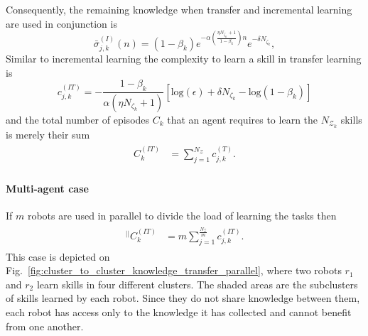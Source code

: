 Consequently, the remaining knowledge when transfer and incremental learning are used in conjunction is
\begin{equation*}\label{eq:remaining_knowledge__ITL}
	\bar{\sigma}^{(I)}_{j,k}(n) = \left(1- \beta_k\right) e^{-\alpha  \left(\frac{ \eta N_{\zeta_k}+1}{1 - \beta_k}\right) n} e^{-\delta N_{\zeta_k}},
\end{equation*}
Similar to incremental learning the complexity to learn a skill in transfer learning is
\begin{equation}\label{eq:skill_complexity_TL}
	c^{(IT)}_{j,k} = -\frac{1 - \beta_{k}}{\alpha (\eta N_{\zeta_k}+ 1)}\left[\text{log}(\epsilon) + \delta N_{\zeta_k} - \text{log}(1 - \beta_{k})\right]
\end{equation}
and the total number of episodes  $ C_k $ that an agent requires to learn the $N_{\mathcal{Z}_k}$ skills is merely their sum
\begin{align}\label{eq:total_episodes_transfer}
	\begin{split}
		C^{(IT)}_k &= \sum^{N_{\mathcal{Z}}}_{j=1} c^{(T)}_{j,k}.
	\end{split}
\end{align}

\paragraph*{Multi-agent case}
If $m$ robots are used in parallel to divide the load of learning the tasks then
\begin{align}
	\begin{split}
		{}^{\lvert \rvert}C^{(IT)}_k &= m\sum^{\frac{N_{\mathcal{Z}}}{m}}_{j=1} c^{(IT)}_{j,k}.
	\end{split}
\end{align}
This case is depicted on Fig.~\ref{fig:cluster_to_cluster_knowledge_transfer_parallel}, where two robots $ r_1$ and $r_2$ learn skills in four different clusters. The shaded areas are the subclusters of skills learned by each robot. Since they do not share knowledge between them, each robot has access only to the knowledge it has collected and cannot benefit from one another. 

